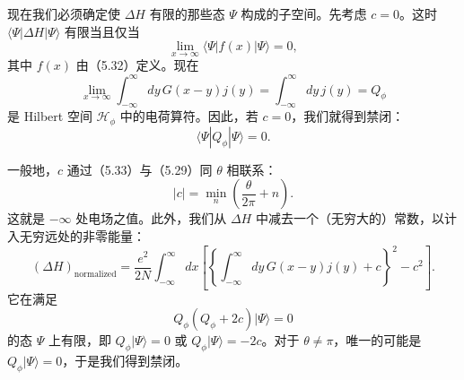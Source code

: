 
现在我们必须确定使 $\Delta H$ 有限的那些态 $\Psi$ 构成的子空间。先考虑 $c=0$。这时 $\langle\Psi|\Delta H|\Psi\rangle$ 有限当且仅当
\[
  \lim_{x\to\infty}\langle\Psi|f(x)|\Psi\rangle=0,
\]
其中 $f(x)$ 由（5.32）定义。现在
\[
  \lim_{x\to\infty}\int_{-\infty}^{\infty}dy\,G(x-y)j(y)=\int_{-\infty}^{\infty}dy\,j(y)=Q_\phi
\]
是 Hilbert 空间 $\mathcal{H}_\phi$ 中的电荷算符。因此，若 $c=0$，我们就得到禁闭：
\[
  \langle\Psi|Q_\phi|\Psi\rangle=0.
\]

一般地，$c$ 通过（5.33）与（5.29）同 $\theta$ 相联系：
\[
  |c|=\min_n\left(\frac{\theta}{2\pi}+n\right).
\]
这就是 $-\infty$ 处电场之值。此外，我们从 $\Delta H$ 中减去一个（无穷大的）常数，以计入无穷远处的非零能量：
\[
  (\Delta H)_{\mathrm{normalized}}=\frac{e^2}{2N}\int_{-\infty}^{\infty}dx\left[\left\{\int_{-\infty}^{\infty}dy\,G(x-y)j(y)+c\right\}^2-c^2\right].
\]
它在满足
\begin{equation}
  \tag{5.34}
  \label{eq:5-34}
  Q_\phi(Q_\phi+2c)|\Psi\rangle=0
\end{equation}
的态 $\Psi$ 上有限，即 $Q_\phi|\Psi\rangle=0$ 或 $Q_\phi|\Psi\rangle=-2c$。对于 $\theta\neq\pi$，唯一的可能是 $Q_\phi|\Psi\rangle=0$，于是我们得到禁闭。


